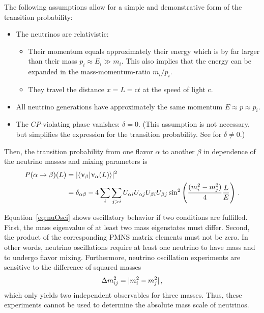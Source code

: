 The following assumptions allow for a simple and demonstrative form of the transition probability:
\begin{itemize}
    \renewcommand{\labelitemi}{$\bullet$}
    \renewcommand{\labelitemii}{$\circ$}
    \item The neutrinos are relativistic: 
    \begin{itemize}
        \item Their momentum equals approximately their energy which is by far larger than their mass $p_i \approx E_i \gg m_i$. This also implies that the energy can be expanded in the mass-momentum-ratio $m_i/p_i$.
        \item They travel the distance $x=L=\mathrm{c}t$ at the speed of light $\mathrm{c}$.
    \end{itemize}
    \item All neutrino generations have approximately the same momentum $E \approx p \approx p_i$.
    \item The $CP$-violating phase vanishes: $\delta=0$. (This assumption is not necessary, but simplifies the expression for the transition probability. See \cite{zuber2011neutrino} for $\delta \neq 0$.)
\end{itemize}
Then, the transition probability from one flavor $\alpha$ to another $\beta$ in dependence of the neutrino masses and mixing parameters is
\begin{equation}
    \begin{split}
    P(\alpha \rightarrow \beta)(L) 
    &= \lvert\left\langle\upnu_\beta \middle| \upnu_\alpha(L)\right\rangle\rvert^2 \\
    &= 
    \delta_{\alpha\beta}-
    4\sum_{i}\sum_{j>i} U_{\alpha i} U_{\alpha j} U_{\beta i} U_{\beta j} 
    \sin^2\left( \frac{(m_i^2-m_j^2)}{4} \frac{L}{E} \right)
    \text{\,.}
    \end{split}
    \label{eq:nuOsci}
\end{equation}

Equation~\eqref{eq:nuOsci} shows oscillatory behavior if two conditions are fulfilled. First, the mass eigenvalue of at least two mass eigenstates must differ. Second, the product of the corresponding PMNS matrix elements must not be zero. In other words, neutrino oscillations require at least one neutrino to have mass and to undergo flavor mixing. Furthermore, neutrino oscillation experiments are sensitive to the difference of squared masses 
\begin{equation}
    \label{eq:massSquaredDiff}
    \Delta m^2_{ij} =  \lvert m^2_i - m^2_j\rvert
    \text{\,,}
\end{equation}
which only yields two independent observables for three masses. Thus, these experiments cannot be used to determine the absolute mass scale of neutrinos.

